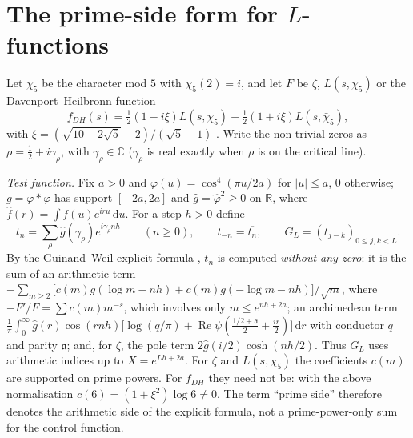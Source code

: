 \documentclass[11pt]{amsart}
\theoremstyle{remark}
\theoremstyle{definition}
\renewcommand{\Re}{\operatorname{Re}}
\newcommand{\dd}{\,\mathrm{d}}
\begin{document}
\section{The prime-side form for $L$-functions}\label{sec:L}

Let $\chi_5$ be the character mod $5$ with $\chi_5(2)=i$, and let $F$ be $\zeta$, $L(s,\chi_5)$ or the Davenport--Heilbronn function
\[
f_{DH}(s)=\tfrac12(1-i\xi)L(s,\chi_5)+\tfrac12(1+i\xi)L(s,\bar\chi_5),
\]
with $\xi=(\sqrt{10-2\sqrt5}-2)/(\sqrt5-1)$ \cite{DH36}. Write the non-trivial zeros as $\rho=\frac12+i\gamma_\rho$, with $\gamma_\rho\in\mathbb C$ ($\gamma_\rho$ is real exactly when $\rho$ is on the critical line).

\emph{Test function.} Fix $a>0$ and $\varphi(u)=\cos^4(\pi u/2a)$ for $|u|\le a$, $0$ otherwise; $g=\varphi*\varphi$ has support $[-2a,2a]$ and $\hat g=\hat\varphi^2\ge0$ on $\mathbb R$, where $\hat f(r)=\int f(u)e^{iru}\dd u$. For a step $h>0$ define
\[
t_n=\sum_\rho\hat g(\gamma_\rho)e^{i\gamma_\rho nh}\qquad(n\ge0),\qquad t_{-n}=\overline{t_n},\qquad G_L=(t_{j-k})_{0\le j,k<L}.
\]
By the Guinand--Weil explicit formula \cite{Wei52,Bom00}, $t_n$ is computed \emph{without any zero}: it is the sum of an arithmetic term $-\sum_{m\ge2}\big[c(m)g(\log m-nh)+\overline{c(m)}g(-\log m-nh)\big]/\sqrt m$, where $-F'/F=\sum c(m)m^{-s}$, which involves only $m\le e^{nh+2a}$; an archimedean term $\frac1\pi\int_0^\infty\hat g(r)\cos(rnh)\big[\log(q/\pi)+\Re\psi(\frac{1/2+\mathfrak a}2+\frac{ir}2)\big]\dd r$ with conductor $q$ and parity $\mathfrak a$; and, for $\zeta$, the pole term $2\hat g(i/2)\cosh(nh/2)$. Thus $G_L$ uses arithmetic indices up to $X=e^{Lh+2a}$. For $\zeta$ and $L(s,\chi_5)$ the coefficients $c(m)$ are supported on prime powers. For $f_{DH}$ they need not be: with the above normalisation $c(6)=(1+\xi^2)\log6\ne0$. The term ``prime side'' therefore denotes the arithmetic side of the explicit formula, not a prime-power-only sum for the control function.
\end{document}
